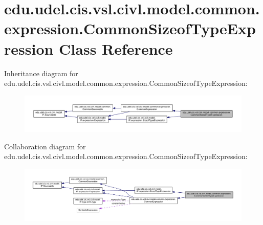\hypertarget{classedu_1_1udel_1_1cis_1_1vsl_1_1civl_1_1model_1_1common_1_1expression_1_1CommonSizeofTypeExpression}{}\section{edu.\+udel.\+cis.\+vsl.\+civl.\+model.\+common.\+expression.\+Common\+Sizeof\+Type\+Expression Class Reference}
\label{classedu_1_1udel_1_1cis_1_1vsl_1_1civl_1_1model_1_1common_1_1expression_1_1CommonSizeofTypeExpression}


Inheritance diagram for edu.\+udel.\+cis.\+vsl.\+civl.\+model.\+common.\+expression.\+Common\+Sizeof\+Type\+Expression\+:
\nopagebreak
\begin{figure}[H]
\begin{center}
\leavevmode
\includegraphics[width=350pt]{classedu_1_1udel_1_1cis_1_1vsl_1_1civl_1_1model_1_1common_1_1expression_1_1CommonSizeofTypeExpression__inherit__graph}
\end{center}
\end{figure}


Collaboration diagram for edu.\+udel.\+cis.\+vsl.\+civl.\+model.\+common.\+expression.\+Common\+Sizeof\+Type\+Expression\+:
\nopagebreak
\begin{figure}[H]
\begin{center}
\leavevmode
\includegraphics[width=350pt]{classedu_1_1udel_1_1cis_1_1vsl_1_1civl_1_1model_1_1common_1_1expression_1_1CommonSizeofTypeExpression__coll__graph}
\end{center}
\end{figure}
